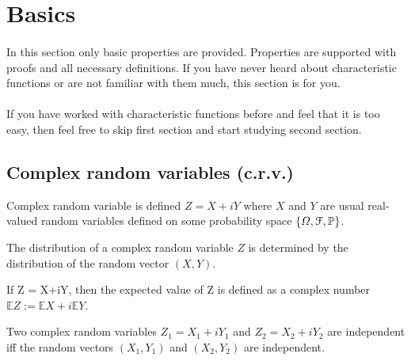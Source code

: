 \section{Basics}\label{bscs}
\paragraph{}
In this section only basic properties are provided. Properties are supported with proofs and all necessary definitions. If you have never heard about characteristic functions or are not familiar with them much, this section is for you. 
\paragraph{}
If you have worked with characteristic functions before and feel that it is too easy, then feel free to skip first section and start studying second section. 
\subsection{Complex random variables (c.r.v.)}
\begin{definition}
Complex random variable is defined $Z = X +iY$ where $X$ and $Y$ are usual real-valued random variables defined on some probability space $\{\Omega, {\cal{F}}, \mathbb{P}\}$.
\end{definition}

\begin{definition}
The distribution of a complex random variable $Z$ is determined by the distribution of the random vector $(X,Y)$. 
\end{definition}

\begin{definition}
If Z = X+iY, then the expected value of Z is defined as a complex number $\mathbb{E}Z :=\mathbb{E}X+ i\mathbb{E}Y$.
\end{definition}

\begin{definition}
Two complex random variables $Z_1 = X_1 + iY_1$ and $Z_2 = X_2 + iY_2$ are independent iff the random vectors $(X_1,Y_1)$ and $(X_2,Y_2)$ are independent. 
\end{definition}

